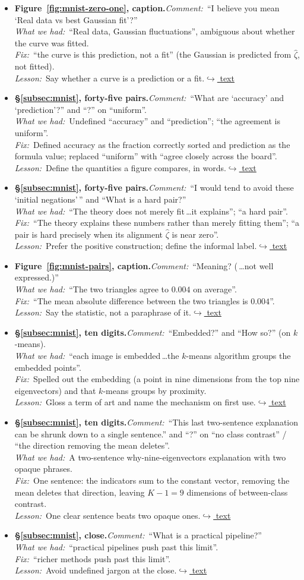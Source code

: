 \documentclass[12pt]{article}
\newcommand{\gdlogentry}[6]{%
  \item[\textcolor{thesisRev}{$\star$\,\ref{gdrev:#1}}]\hypertarget{gdlog:#1}{}%
  \textbf{#2.}\enspace\emph{Comment:}~#3\\
  \emph{What we had:}~#4\\
  \emph{Fix:}~#5\\
  \emph{Lesson:}~#6\enspace\hyperlink{gdtext:#1}{\textcolor{thesisLink}{$\hookrightarrow$ text}}}
\begin{document}
\begin{itemize}[leftmargin=2.4em,itemsep=0.55em]
\gdlogentry{r4-fit}{Figure~\ref{fig:mnist-zero-one}, caption}{``I believe you mean `Real data vs best Gaussian fit'?''}{``Real data, Gaussian fluctuations'', ambiguous about whether the curve was fitted.}{``the curve is this prediction, not a fit'' (the Gaussian is predicted from \(\widehat{\zeta}\), not fitted).}{Say whether a curve is a prediction or a fit.}

\gdlogentry{r4-pairs}{\S\ref{subsec:mnist}, forty-five pairs}{``What are `accuracy' and `prediction'?'' and ``?'' on ``uniform''.}{Undefined ``accuracy'' and ``prediction''; ``the agreement is uniform''.}{Defined accuracy as the fraction correctly sorted and prediction as the formula value; replaced ``uniform'' with ``agree closely across the board''.}{Define the quantities a figure compares, in words.}

\gdlogentry{r4-negation}{\S\ref{subsec:mnist}, forty-five pairs}{``I would tend to avoid these `initial negations'\,'' and ``What is a hard pair?''}{``The theory does not merely fit\,\dots it explains''; ``a hard pair''.}{``The theory explains these numbers rather than merely fitting them''; ``a pair is hard precisely when its alignment \(\widehat{\zeta}\) is near zero''.}{Prefer the positive construction; define the informal label.}

\gdlogentry{r4-pairs-caption}{Figure~\ref{fig:mnist-pairs}, caption}{``Meaning? (\,\dots not well expressed.)''}{``The two triangles agree to \(0.004\) on average''.}{``The mean absolute difference between the two triangles is \(0.004\)''.}{Say the statistic, not a paraphrase of it.}

\gdlogentry{r4-embedded}{\S\ref{subsec:mnist}, ten digits}{``Embedded?'' and ``How so?'' (on \(k\)-means).}{``each image is embedded\,\dots the \(k\)-means algorithm groups the embedded points''.}{Spelled out the embedding (a point in nine dimensions from the top nine eigenvectors) and that \(k\)-means groups by proximity.}{Gloss a term of art and name the mechanism on first use.}

\gdlogentry{r4-ninedim}{\S\ref{subsec:mnist}, ten digits}{``This last two-sentence explanation can be shrunk down to a single sentence.'' and ``?'' on ``no class contrast'' / ``the direction removing the mean deletes''.}{A two-sentence why-nine-eigenvectors explanation with two opaque phrases.}{One sentence: the indicators sum to the constant vector, removing the mean deletes that direction, leaving \(K-1=9\) dimensions of between-class contrast.}{One clear sentence beats two opaque ones.}

\gdlogentry{r4-practical}{\S\ref{subsec:mnist}, close}{``What is a practical pipeline?''}{``practical pipelines push past this limit''.}{``richer methods push past this limit''.}{Avoid undefined jargon at the close.}
\end{itemize}
\end{document}
